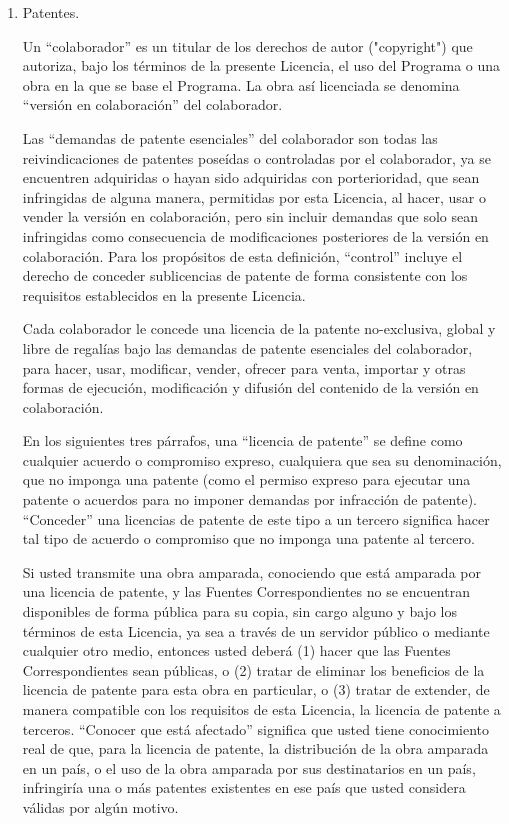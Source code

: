 \documentclass[11pt]{article}
\begin{document}
\begin{enumerate}
\item Patentes.

Un ``colaborador'' es un titular de los derechos de autor ("copyright") que 
autoriza, bajo los t\'{e}rminos de la presente Licencia, el uso del Programa o 
una obra en la que se base el Programa. La obra as\'{i} licenciada se denomina 
``versi\'{o}n en colaboraci\'{o}n'' del colaborador.

Las ``demandas de patente esenciales'' del colaborador son todas las 
reivindicaciones de patentes pose\'{i}das o controladas por el colaborador, ya 
se encuentren adquiridas o hayan sido adquiridas con porterioridad, que sean 
infringidas de alguna manera, permitidas por esta Licencia, al hacer, usar 
o vender la versi\'{o}n en colaboraci\'{o}n, pero sin incluir demandas que solo sean 
infringidas como consecuencia de modificaciones posteriores de la versi\'{o}n 
en colaboraci\'{o}n. Para los prop\'{o}sitos de esta definici\'{o}n, ``control'' incluye 
el derecho de conceder sublicencias de patente de forma consistente con los 
requisitos establecidos en la presente Licencia.

Cada colaborador le concede una licencia de la patente no-exclusiva, 
global y libre de regal\'{i}as bajo las demandas de patente esenciales del 
colaborador, para hacer, usar, modificar, vender, ofrecer para venta, 
importar y otras formas de ejecuci\'{o}n, modificaci\'{o}n y difusi\'{o}n del 
contenido de la versi\'{o}n en colaboraci\'{o}n.

En los siguientes tres p\'{a}rrafos, una ``licencia de patente'' se define como 
cualquier acuerdo o compromiso expreso, cualquiera que sea su denominaci\'{o}n, 
que no imponga una patente (como el permiso expreso para ejecutar una 
patente o acuerdos para no imponer demandas por infracci\'{o}n de patente). 
``Conceder'' una licencias de patente de este tipo a un tercero significa 
hacer tal tipo de acuerdo o compromiso que no imponga una patente al tercero.

Si usted transmite una obra amparada, conociendo que está amparada por 
una licencia de patente, y las Fuentes Correspondientes no se encuentran 
disponibles de forma p\'{u}blica para su copia, sin cargo alguno y bajo los 
t\'{e}rminos de esta Licencia, ya sea a trav\'{e}s de un servidor p\'{u}blico o mediante 
cualquier otro medio, entonces usted deberá (1) hacer que las Fuentes 
Correspondientes sean p\'{u}blicas, o (2) tratar de eliminar los beneficios de 
la licencia de patente para esta obra en particular, o (3) tratar de 
extender, de manera compatible con los requisitos de esta Licencia, la 
licencia de patente a terceros. ``Conocer que está afectado'' significa que 
usted tiene conocimiento real de que, para la licencia de patente, la 
distribuci\'{o}n de la obra amparada en un pa\'{i}s, o el uso de la obra amparada 
por sus destinatarios en un pa\'{i}s, infringir\'{i}a una o más patentes existentes 
en ese pa\'{i}s que usted considera válidas por alg\'{u}n motivo.


\end{enumerate}
\end{document}
